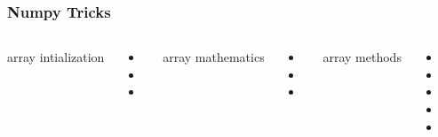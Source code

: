 \begin{frame}[fragile]

    \frametitle{Numpy Tricks}


    \begin{columns}[t]


            array intialization

            \begin{itemize}
                \item {}

                \item {}

                \item {}

            \end{itemize}




            array mathematics

            \begin{itemize}
                \item {}
                \item \code{ += }
                \item {}
            \end{itemize}

            array methods

            \begin{itemize}
                \item {}
                \item {}
                \item {}
                \item {}
                \item {}
            \end{itemize}

    \end{columns}

\end{frame}


% 
% 
% 
% 
% 
% 
% 
% 
% 
% 


